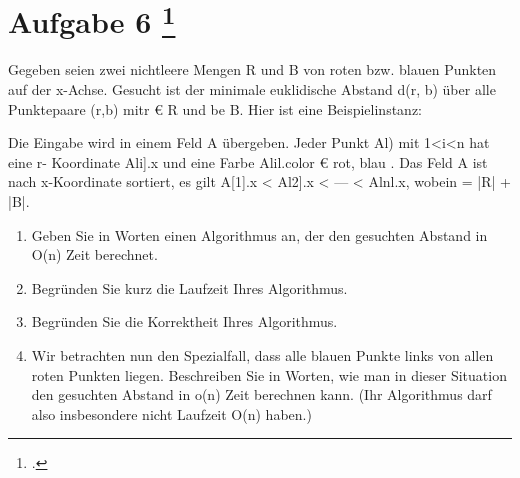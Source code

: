 \documentclass{lehramt-informatik-aufgabe}
\begin{document}
\section{Aufgabe 6
\footcite{46115:2020:03}}

Gegeben seien zwei nichtleere Mengen R und B von roten bzw. blauen
Punkten auf der x-Achse. Gesucht ist der minimale euklidische Abstand
d(r, b) über alle Punktepaare (r,b) mitr € R und be B. Hier ist eine
Beispielinstanz:

Die Eingabe wird in einem Feld A übergeben. Jeder Punkt Al) mit 1<i<n
hat eine r- Koordinate Ali].x und eine Farbe Alil.color € { rot, blau }.
Das Feld A ist nach x-Koordinate sortiert, \dh es gilt A[1].x < Al2].x
< --- < Alnl.x, wobein = |R| + |B|.

\begin{enumerate}


\item Geben Sie in Worten einen Algorithmus an, der den gesuchten
Abstand in O(n) Zeit berechnet.


\item Begründen Sie kurz die Laufzeit Ihres Algorithmus.


\item Begründen Sie die Korrektheit Ihres Algorithmus.


\item Wir betrachten nun den Spezialfall, dass alle blauen Punkte links
von allen roten Punkten liegen. Beschreiben Sie in Worten, wie man in
dieser Situation den gesuchten Abstand in o(n) Zeit berechnen kann. (Ihr
Algorithmus darf also insbesondere nicht Laufzeit O(n) haben.)

\end{enumerate}
\end{document}
